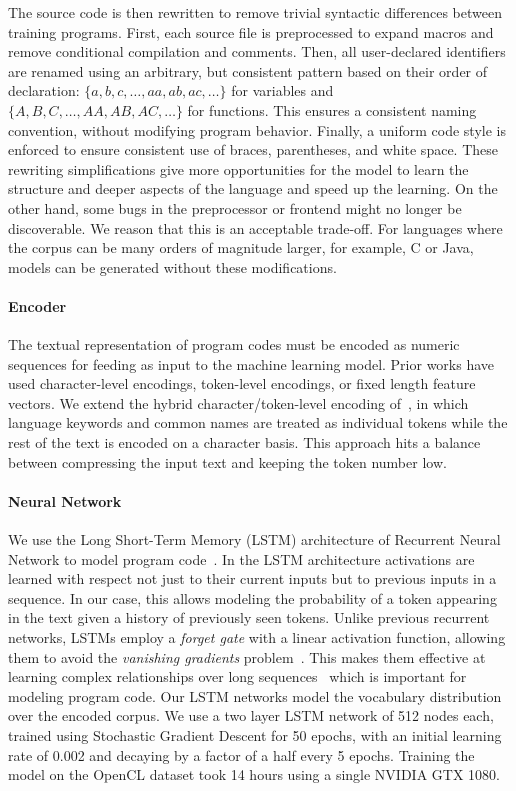 The source code is then rewritten to remove trivial syntactic differences between training programs. First, each source file is preprocessed to expand macros and remove conditional compilation and comments. Then, all user-declared identifiers are renamed using an arbitrary, but consistent pattern based on their order of declaration: $\{a,\allowbreak b,\allowbreak c,\allowbreak \ldots,\allowbreak aa,\allowbreak ab,\allowbreak ac,\allowbreak \ldots\}$ for variables and $\{A,\allowbreak B,\allowbreak C,\allowbreak \ldots,\allowbreak AA,\allowbreak AB,\allowbreak AC,\allowbreak \ldots\}$ for functions. This ensures a consistent naming convention, without modifying program behavior. Finally, a uniform code style is enforced to ensure consistent use of braces, parentheses, and white space. These rewriting simplifications give more opportunities for the model to learn the structure and deeper aspects of the language and speed up the learning. On the other hand, some bugs in the preprocessor or frontend might no longer be discoverable. We reason that this is an acceptable trade-off. For languages where the corpus can be many orders of magnitude larger, for example, C or Java, models can be generated without these modifications.

\paragraph{Encoder} The textual representation of program codes must be encoded as numeric sequences for feeding as input to the machine learning model. Prior works have used character-level encodings, token-level encodings, or fixed length feature vectors. We extend the hybrid character/token-level encoding of~\cite{Cummins2017b}, in which language keywords and common names are treated as individual tokens while the rest of the text is encoded on a character basis. This approach hits a balance between compressing the input text and keeping the token number low. 

\paragraph{Neural Network} We use the Long Short-Term Memory (LSTM) architecture of Recurrent Neural Network to model program code~\cite{Hochreiter1997}. In the LSTM architecture activations are learned with respect not just to their current inputs but to previous inputs in a sequence. In our case, this allows modeling the probability of a token appearing in the text given a history of previously seen tokens. Unlike previous recurrent networks, LSTMs employ a \emph{forget gate} with a linear activation function, allowing them to avoid the \emph{vanishing gradients} problem~\cite{Pacanu2013}. This makes them effective at learning complex relationships over long sequences~\cite{Lipton2015} which is important for modeling program code. Our LSTM networks model the vocabulary distribution over the encoded corpus. We use a two layer LSTM network of 512 nodes each, trained using Stochastic Gradient Descent for 50 epochs, with an initial learning rate of 0.002 and decaying by a factor of a half every 5 epochs. Training the model on the OpenCL dataset took 14 hours using a single NVIDIA GTX 1080.

